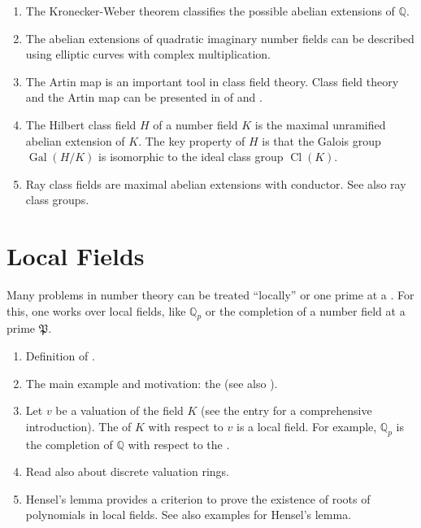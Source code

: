 \documentclass[12pt]{article}
\newcommand{\Rats}{\mathbb{Q}}
\newcommand{\Gal}{\operatorname{Gal}}
\newcommand{\Cl}{\operatorname{Cl}}
\renewcommand{\P}{{\mathfrak{P}}}
\begin{document}
\begin{enumerate}
\item The Kronecker-Weber theorem classifies the possible abelian extensions of $\Rats$.

\item The abelian extensions of quadratic imaginary number fields can be described using elliptic curves with complex multiplication.

\item The Artin map is an important tool in class field theory. Class field theory and the Artin map can be presented in  of  and . 

\item The Hilbert class field $H$ of a number field $K$ is the maximal unramified abelian extension of $K$. The key property of $H$ is that the Galois group $\Gal(H/K)$ is isomorphic to the ideal class group $\Cl(K)$.

\item Ray class fields are maximal abelian extensions with  conductor. See also ray class groups.
\end{enumerate}

\section{Local Fields}
Many problems in number theory can be treated ``locally'' or one prime at a . For this, one works over local fields, like $\Rats_p$ or the completion of a number field at a prime $\P$.
\begin{enumerate}
\item Definition of .
\item The main example and motivation: the  (see also ).
\item Let $v$ be a valuation of the field $K$ (see the entry  for a comprehensive introduction). The  of $K$ with respect to $v$ is a local field. For example, $\Rats_p$ is the completion of $\Rats$ with respect to the .
\item Read also about discrete valuation rings.
\item Hensel's lemma provides a criterion to prove the existence of roots of polynomials in local fields. See also examples for Hensel's lemma.
\end{enumerate}
\end{document}
